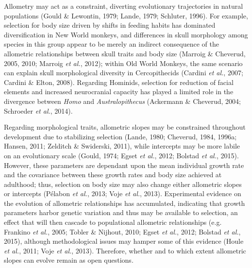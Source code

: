 \documentclass[12pt,twoside]{report}
\begin{document}
Allometry may act as a constraint, diverting evolutionary trajectories
in natural populations (Gould \& Lewontin, 1979; Lande, 1979; Schluter,
1996). For example, selection for body size driven by shifts in feeding
habits has dominated diversification in New World monkeys, and
differences in skull morphology among species in this group appear to be
merely an indirect consequence of the allometric relationships between
skull traits and body size (Marroig \& Cheverud, 2005, 2010; Marroig
\emph{et al.}, 2012); within Old World Monkeys, the same scenario can
explain skull morphological diversity in Cercopithecids (Cardini
\emph{et al.}, 2007; Cardini \& Elton, 2008). Regarding Hominids,
selection for reduction of facial elements and increased neurocranial
capacity has played a limited role in the divergence between \emph{Homo}
and \emph{Australopithecus} (Ackermann \& Cheverud, 2004; Schroeder
\emph{et al.}, 2014).

Regarding morphological traits, allometric slopes may be constrained
throughout development due to stabilizing selection (Lande, 1980;
Cheverud, 1984, 1996a; Hansen, 2011; Zelditch \& Swiderski, 2011), while
intercepts may be more labile on an evolutionary scale (Gould, 1974;
Egset \emph{et al.}, 2012; Bolstad \emph{et al.}, 2015). However, these
parameters are dependant upon the mean individual growth rate and the
covariance between these growth rates and body size achieved at
adulthood; thus, selection on body size may also change either
allometric slopes or intercepts (Pélabon \emph{et al.}, 2013; Voje
\emph{et al.}, 2013). Experimental evidence on the evolution of
allometric relationships has accumulated, indicating that growth
parameters harbor genetic variation and thus may be available to
selection, an effect that will then cascade to populational allometric
relationships (e.g. Frankino \emph{et al.}, 2005; Tobler \& Nijhout,
2010; Egset \emph{et al.}, 2012; Bolstad \emph{et al.}, 2015), although
methodological issues may hamper some of this evidence (Houle \emph{et
al.}, 2011; Voje \emph{et al.}, 2013). Therefore, whether and to which
extent allometric slopes can evolve remain as open questions.
\end{document}
